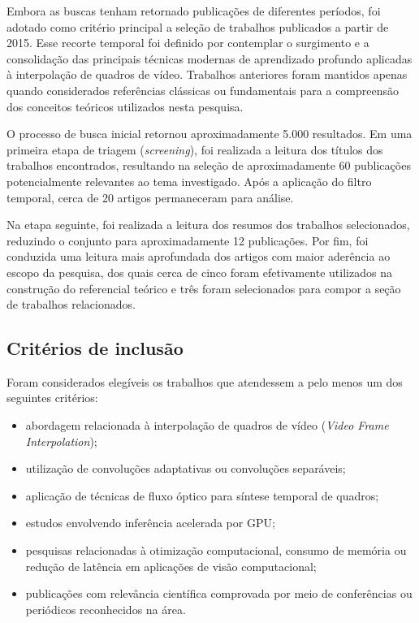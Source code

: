 \documentclass[
    12pt,                %
    openright,           %
    oneside,             %
    a4paper,             %
    english,             %
    brazil               %
]{abntex2}
\begin{document}
Embora as buscas tenham retornado publicações de diferentes períodos, foi adotado como critério principal a seleção de trabalhos publicados a partir de 2015. Esse recorte temporal foi definido por contemplar o surgimento e a consolidação das principais técnicas modernas de aprendizado profundo aplicadas à interpolação de quadros de vídeo. Trabalhos anteriores foram mantidos apenas quando considerados referências clássicas ou fundamentais para a compreensão dos conceitos teóricos utilizados nesta pesquisa.

O processo de busca inicial retornou aproximadamente 5.000 resultados. Em uma primeira etapa de triagem (\textit{screening}), foi realizada a leitura dos títulos dos trabalhos encontrados, resultando na seleção de aproximadamente 60 publicações potencialmente relevantes ao tema investigado. Após a aplicação do filtro temporal, cerca de 20 artigos permaneceram para análise.

Na etapa seguinte, foi realizada a leitura dos resumos dos trabalhos selecionados, reduzindo o conjunto para aproximadamente 12 publicações. Por fim, foi conduzida uma leitura mais aprofundada dos artigos com maior aderência ao escopo da pesquisa, dos quais cerca de cinco foram efetivamente utilizados na construção do referencial teórico e três foram selecionados para compor a seção de trabalhos relacionados.

\subsection{Critérios de inclusão}

Foram considerados elegíveis os trabalhos que atendessem a pelo menos um dos seguintes critérios:

\begin{itemize}
    \item abordagem relacionada à interpolação de quadros de vídeo (\textit{Video Frame Interpolation});
    \item utilização de convoluções adaptativas ou convoluções separáveis;
    \item aplicação de técnicas de fluxo óptico para síntese temporal de quadros;
    \item estudos envolvendo inferência acelerada por GPU;
    \item pesquisas relacionadas à otimização computacional, consumo de memória ou redução de latência em aplicações de visão computacional;
    \item publicações com relevância científica comprovada por meio de conferências ou periódicos reconhecidos na área.
\end{itemize}
\end{document}
